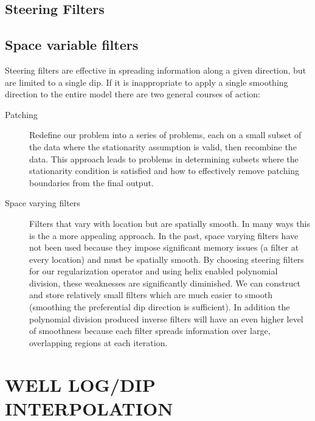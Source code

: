 \subsection{Steering Filters}
 

\subsection{Space variable filters}
Steering filters are effective in spreading information
along a given direction, but are limited to a single dip.
If it is inappropriate to apply a single smoothing direction to
the entire
model 
there are two general
courses of action:
\begin{description}
\item [Patching] \cite[]{Claerbout.sep.73.391,Schwab.sep.84.271}
Redefine our problem into a series of problems,
each on a small subset of the data where the stationarity assumption is
valid, then recombine the data.  This approach leads to problems in determining
                 subsets where the stationarity condition is satisfied
    and how to effectively remove patching boundaries from the final output.
\item [Space varying filters] Filters that vary with location
but are spatially smooth. In many ways this is the a more appealing
approach.
In the past, space varying filters have not been used because they
impose significant memory issues (a filter at every location) and must
be spatially smooth.
By choosing steering filters for our regularization operator and using
helix enabled polynomial division, these 
weaknesses are significantly diminished.  
We can construct and store relatively
small filters which are much easier to smooth  (smoothing the preferential
dip direction is sufficient).
In addition the polynomial division produced inverse
filters will have an even higher level of smoothness because 
each filter spreads
information over large, overlapping regions at each iteration.
\end{description}

\section{WELL LOG/DIP INTERPOLATION}

